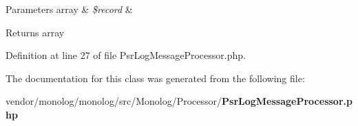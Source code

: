\begin{DoxyParams}[1]{Parameters}
array & {\em \$record} & \\
\hline
\end{DoxyParams}
\begin{DoxyReturn}{Returns}
array 
\end{DoxyReturn}


Definition at line 27 of file Psr\+Log\+Message\+Processor.\+php.



The documentation for this class was generated from the following file\+:\begin{DoxyCompactItemize}
\item 
vendor/monolog/monolog/src/\+Monolog/\+Processor/{\bf Psr\+Log\+Message\+Processor.\+php}\end{DoxyCompactItemize}
